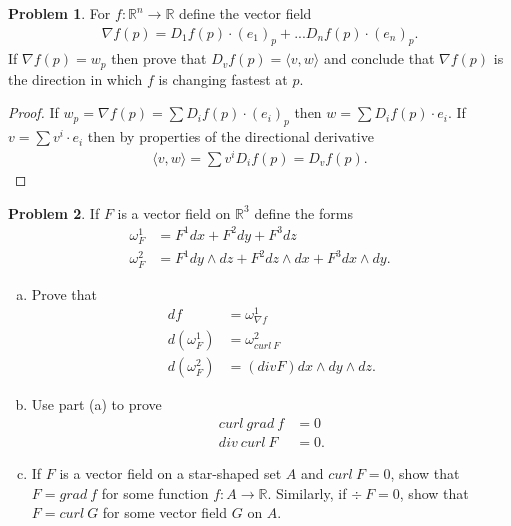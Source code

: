 \documentclass[20pt]{article}
\theoremstyle{plain}
\theoremstyle{definition}
\newtheorem*{problem}{Problem}
\newcommand{\reals}{\mathbb{R}}
\begin{document}
\begin{problem}{4.18}
  For $f: \reals^n \to \reals$ define the vector field 
  \begin{align*}
    \nabla f (p) = D_1f(p)\cdot (e_1)_p + ... D_nf(p)\cdot (e_n)_p.
  \end{align*}
  If $\nabla f(p) = w_p$ then prove that $D_vf(p) = \langle v, w \rangle$ and 
  conclude that $\nabla f (p)$ is the direction in which $f$ is changing fastest at $p$.
\end{problem}
\begin{proof}
  If $w_p = \nabla f (p) = \sum D_i f(p) \cdot (e_i)_p$ then $w = \sum D_i f(p) \cdot e_i.$
  If $v = \sum v^i \cdot e_i$ then by properties of the directional derivative
  \begin{align}
    \langle v, w \rangle = 
    \sum v^i D_if(p) = D_v f(p).
  \end{align}
\end{proof}








\begin{problem}{4.19}
  If $F$ is a vector field on $\reals^3$ define the forms 
  \begin{align*}
    \omega^1_F &= F^1 dx + F^2 dy + F^3 dz \\
    \omega^2_F &= F^1 dy \wedge dz + F^2 dz \wedge dx + F^3 dx \wedge dy. 
  \end{align*}
  \begin{enumerate}[(a)]
    \item Prove that
    \begin{align*}
      df &= \omega^1_{\nabla f}\\
      d(\omega^1_F) &= \omega^2_{curl\ F} \\
      d(\omega^2_F) &= (div F)dx \wedge dy \wedge dz.
    \end{align*}
    \item 
    Use part (a) to prove
    \begin{align*}
      curl \ grad\ f &= 0 \\
      div \ curl \ F &= 0.
    \end{align*}
    \item 
    If $F$ is a vector field on a star-shaped set $A$ and $curl\ F = 0$, show that 
    $F = grad\ f$ for some function $f: A \to \reals$.  Similarly, if $\div\ F = 0$, 
    show that $F = curl\ G$ for some vector field $G$ on $A$.
  \end{enumerate}
\end{problem}
\end{document}
